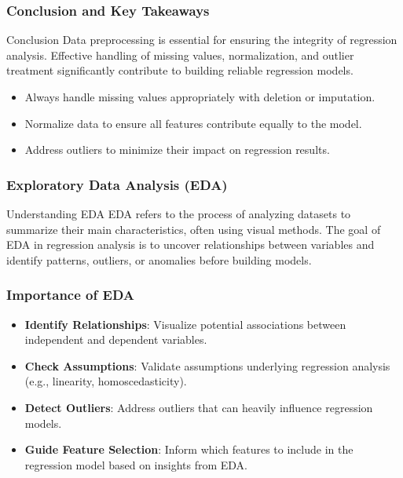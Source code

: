 \documentclass{beamer}
\begin{document}
\begin{frame}[fragile]
    \frametitle{Conclusion and Key Takeaways}
    \begin{block}{Conclusion}
        Data preprocessing is essential for ensuring the integrity of regression analysis. Effective handling of missing values, normalization, and outlier treatment significantly contribute to building reliable regression models.
    \end{block}
    
    \begin{itemize}
        \item Always handle missing values appropriately with deletion or imputation.
        \item Normalize data to ensure all features contribute equally to the model.
        \item Address outliers to minimize their impact on regression results.
    \end{itemize}
\end{frame}

\begin{frame}[fragile]
    \frametitle{Exploratory Data Analysis (EDA)}
    \begin{block}{Understanding EDA}
        EDA refers to the process of analyzing datasets to summarize their main characteristics, often using visual methods.
        The goal of EDA in regression analysis is to uncover relationships between variables and identify patterns, outliers, or anomalies before building models.
    \end{block}
\end{frame}

\begin{frame}[fragile]
    \frametitle{Importance of EDA}
    \begin{itemize}
        \item \textbf{Identify Relationships}: Visualize potential associations between independent and dependent variables.
        \item \textbf{Check Assumptions}: Validate assumptions underlying regression analysis (e.g., linearity, homoscedasticity).
        \item \textbf{Detect Outliers}: Address outliers that can heavily influence regression models.
        \item \textbf{Guide Feature Selection}: Inform which features to include in the regression model based on insights from EDA.
    \end{itemize}
\end{frame}
\end{document}
